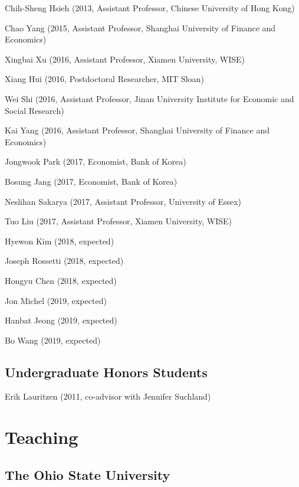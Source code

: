 \documentclass[10pt,letterpaper]{article}
\renewenvironment{itemize}{
  \begin{list}{}{
      \setlength{\leftmargin}{1.5em}
      \setlength{\itemsep}{0.25em}
      \setlength{\parskip}{0pt}
      \setlength{\parsep}{0.25em}
    }
}{
  \end{list}
}
\begin{document}
\begin{itemize}
\item Chih-Sheng Hsieh (2013, Assistant Professor, Chinese University of Hong Kong)
\item Chao Yang (2015, Assistant Professor, Shanghai University of Finance and Economics)
\item Xingbai Xu (2016, Assistant Professor, Xiamen University, WISE)
\item Xiang Hui (2016, Postdoctoral Researcher, MIT Sloan)
\item Wei Shi (2016, Assistant Professor, Jinan University Institute for Economic and Social Research)
\item Kai Yang (2016, Assistant Professor, Shanghai University of Finance and Economics)
\item Jongwook Park (2017, Economist, Bank of Korea)
\item Bosung Jang (2017, Economist, Bank of Korea)
\item Neslihan Sakarya (2017, Assistant Professor, University of Essex)
\item Tuo Liu (2017, Assistant Professor, Xiamen University, WISE)
\item Hyewon Kim (2018, expected)
\item Joseph Rossetti (2018, expected)
\item Hongyu Chen (2018, expected)
\item Jon Michel (2019, expected)
\item Hanbat Jeong (2019, expected)
\item Bo Wang (2019, expected)
\end{itemize}

\subsection*{Undergraduate Honors Students}

\begin{itemize}
\item Erik Lauritzen (2011, co-advisor with Jennifer Suchland)
\end{itemize}

\section*{Teaching}

\subsection*{The Ohio State University}
\end{document}
